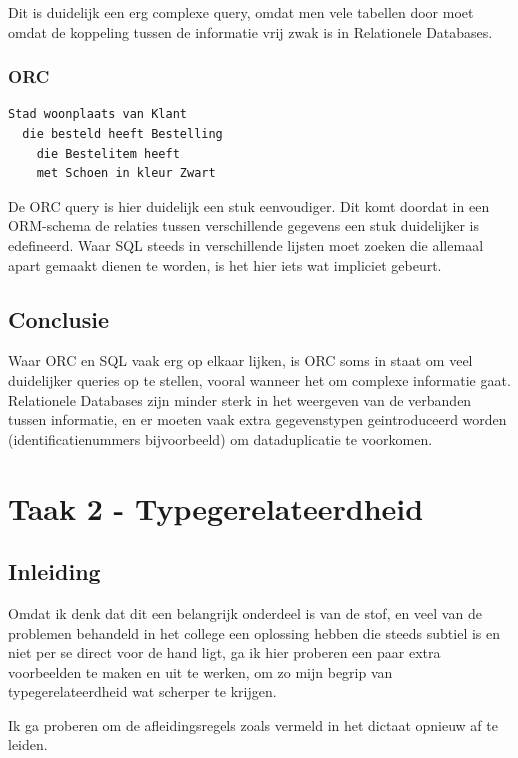 \documentclass[10pt]{article}
\begin{document}
Dit is duidelijk een erg complexe query, omdat men vele tabellen door moet
omdat de koppeling tussen de informatie vrij zwak is in Relationele Databases.

\subsubsection{ORC}

\begin{verbatim}
Stad woonplaats van Klant 
  die besteld heeft Bestelling
    die Bestelitem heeft 
    met Schoen in kleur Zwart
\end{verbatim}

De ORC query is hier duidelijk een stuk eenvoudiger. Dit komt doordat in een
ORM-schema de relaties tussen verschillende gegevens een stuk duidelijker is
edefineerd. Waar SQL steeds in verschillende lijsten moet zoeken die allemaal
apart gemaakt dienen te worden, is het hier iets wat impliciet gebeurt.

\subsection{Conclusie} 

Waar ORC en SQL vaak erg op elkaar lijken, is ORC soms in staat om veel
duidelijker queries op te stellen, vooral wanneer het om complexe informatie
gaat. Relationele Databases zijn minder sterk in het weergeven van de verbanden
tussen informatie, en er moeten vaak extra gegevenstypen geintroduceerd worden
(identificatienummers bijvoorbeeld) om dataduplicatie te voorkomen.

\section{Taak 2 - Typegerelateerdheid}

\subsection{Inleiding}
Omdat ik denk dat dit een belangrijk onderdeel is van de stof, en veel van de
problemen behandeld in het college een oplossing hebben die steeds subtiel is 
en niet per se direct voor de hand ligt, ga ik hier proberen een paar extra
voorbeelden te maken en uit te werken, om zo mijn begrip van 
typegerelateerdheid wat scherper te krijgen.

Ik ga proberen om de afleidingsregels zoals vermeld in het dictaat 
\cite[p.~41]{dictaat} opnieuw af te leiden.
\end{document}
